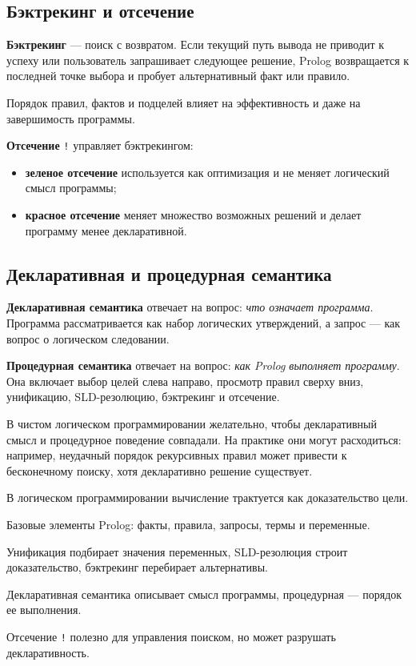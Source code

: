 \subsection*{Бэктрекинг и отсечение}

\textbf{Бэктрекинг} --- поиск с возвратом. Если текущий путь вывода не приводит к успеху или пользователь запрашивает следующее решение, Prolog возвращается к последней точке выбора и пробует альтернативный факт или правило.

Порядок правил, фактов и подцелей влияет на эффективность и даже на завершимость программы.

\textbf{Отсечение} \texttt{!} управляет бэктрекингом:
\begin{itemize}
    \item \textbf{зеленое отсечение} используется как оптимизация и не меняет логический смысл программы;
    \item \textbf{красное отсечение} меняет множество возможных решений и делает программу менее декларативной.
\end{itemize}

\subsection*{Декларативная и процедурная семантика}

\textbf{Декларативная семантика} отвечает на вопрос: \textit{что означает программа}. Программа рассматривается как набор логических утверждений, а запрос --- как вопрос о логическом следовании.

\textbf{Процедурная семантика} отвечает на вопрос: \textit{как Prolog выполняет программу}. Она включает выбор целей слева направо, просмотр правил сверху вниз, унификацию, SLD-резолюцию, бэктрекинг и отсечение.

В чистом логическом программировании желательно, чтобы декларативный смысл и процедурное поведение совпадали. На практике они могут расходиться: например, неудачный порядок рекурсивных правил может привести к бесконечному поиску, хотя декларативно решение существует.

\begin{important}
    \item В логическом программировании вычисление трактуется как доказательство цели.
    \item Базовые элементы Prolog: факты, правила, запросы, термы и переменные.
    \item Унификация подбирает значения переменных, SLD-резолюция строит доказательство, бэктрекинг перебирает альтернативы.
    \item Декларативная семантика описывает смысл программы, процедурная --- порядок ее выполнения.
    \item Отсечение \texttt{!} полезно для управления поиском, но может разрушать декларативность.
\end{important}
